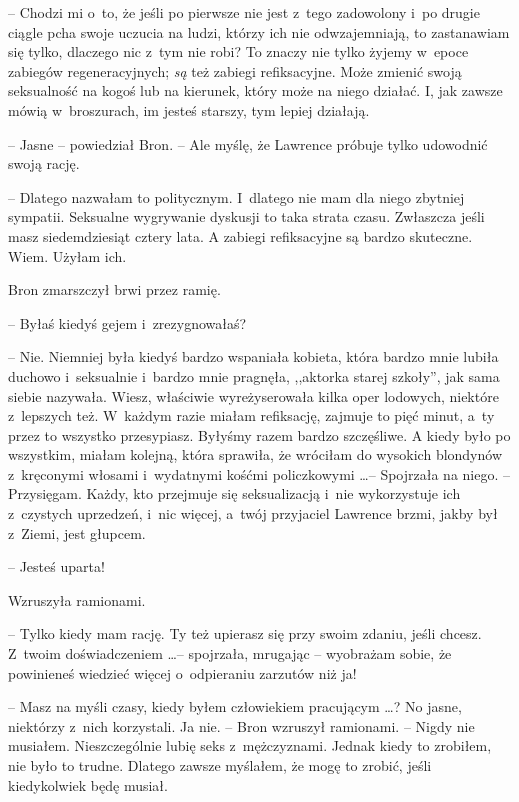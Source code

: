 \documentclass[oneside,polish,11pt,rmheadings]{mwbk}
\begin{document}
-- Chodzi mi o~to, że jeśli po pierwsze nie jest z~tego zadowolony i~po drugie ciągle pcha swoje uczucia na ludzi, którzy ich nie odwzajemniają, to zastanawiam się tylko, dlaczego nic z~tym nie robi? To znaczy nie tylko żyjemy w~epoce zabiegów regeneracyjnych; \textit{są }też zabiegi refiksacyjne. Może zmienić swoją seksualność na kogoś lub na kierunek, który może na niego działać. I, jak zawsze mówią w~broszurach, im jesteś starszy, tym lepiej działają. 

-- Jasne -- powiedział Bron. -- Ale myślę, że Lawrence próbuje tylko udowodnić swoją rację. 

-- Dlatego nazwałam to politycznym. I~dlatego nie mam dla niego zbytniej sympatii. Seksualne wygrywanie dyskusji to taka strata czasu. Zwłaszcza jeśli masz siedemdziesiąt cztery lata. A zabiegi refiksacyjne są bardzo skuteczne. Wiem. Użyłam ich. 

Bron zmarszczył brwi przez ramię. 

-- Byłaś kiedyś gejem i~zrezygnowałaś? 

-- Nie. Niemniej była kiedyś bardzo wspaniała kobieta, która bardzo mnie lubiła duchowo i~seksualnie i~bardzo mnie pragnęła, ,,aktorka starej szkoły'', jak sama siebie nazywała. Wiesz, właściwie wyreżyserowała kilka oper lodowych, niektóre z~lepszych też. W~każdym razie miałam refiksację, zajmuje to pięć minut, a~ty przez to wszystko przesypiasz. Byłyśmy razem bardzo szczęśliwe. A kiedy było po wszystkim, miałam kolejną, która sprawiła, że wróciłam do wysokich blondynów z~kręconymi włosami i~wydatnymi kośćmi policzkowymi \ldots  -- Spojrzała na niego. -- Przysięgam. Każdy, kto przejmuje się seksualizacją i~nie wykorzystuje ich z~czystych uprzedzeń, i~nic więcej, a~twój przyjaciel Lawrence brzmi, jakby był z~Ziemi, jest głupcem. 

-- Jesteś uparta! 

Wzruszyła ramionami. 

-- Tylko kiedy mam rację. Ty też upierasz się przy swoim zdaniu, jeśli chcesz. Z~twoim doświadczeniem \ldots  -- spojrzała, mrugając -- wyobrażam sobie, że powinieneś wiedzieć więcej o~odpieraniu zarzutów niż ja! 

-- Masz na myśli czasy, kiedy byłem człowiekiem pracującym \ldots ? No jasne, niektórzy z~nich korzystali. Ja nie. -- Bron wzruszył ramionami. -- Nigdy nie musiałem.  Nieszczególnie lubię seks z~mężczyznami. Jednak kiedy to zrobiłem, nie było to trudne. Dlatego zawsze myślałem, że mogę to zrobić, jeśli kiedykolwiek będę musiał. 
\end{document}
